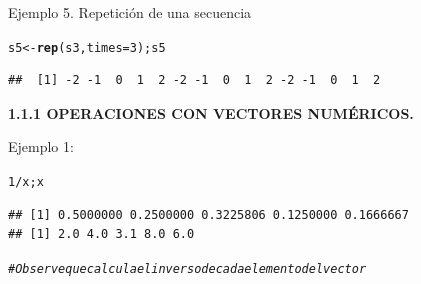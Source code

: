 \documentclass[12pt,letterpaper]{article}\usepackage[]{graphicx}\usepackage[]{color}
\makeatletter
\newcommand{\hlnum}[1]{\textcolor[rgb]{0.686,0.059,0.569}{#1}}%
\newcommand{\hlcom}[1]{\textcolor[rgb]{0.678,0.584,0.686}{\textit{#1}}}%
\newcommand{\hlopt}[1]{\textcolor[rgb]{0,0,0}{#1}}%
\newcommand{\hlstd}[1]{\textcolor[rgb]{0.345,0.345,0.345}{#1}}%
\newcommand{\hlkwb}[1]{\textcolor[rgb]{0.69,0.353,0.396}{#1}}%
\newcommand{\hlkwc}[1]{\textcolor[rgb]{0.333,0.667,0.333}{#1}}%
\newcommand{\hlkwd}[1]{\textcolor[rgb]{0.737,0.353,0.396}{\textbf{#1}}}%
\newenvironment{kframe}{%
 \def\at@end@of@kframe{}%
 \ifinner\ifhmode%
  \def\at@end@of@kframe{\end{minipage}}%
  \begin{minipage}{\columnwidth}%
 \fi\fi%
 \def\FrameCommand##1{\hskip\@totalleftmargin \hskip-\fboxsep
 \colorbox{shadecolor}{##1}\hskip-\fboxsep
     \hskip-\linewidth \hskip-\@totalleftmargin \hskip\columnwidth}%
 \MakeFramed {\advance\hsize-\width
   \@totalleftmargin\z@ \linewidth\hsize
   \@setminipage}}%
 {\par\unskip\endMakeFramed%
 \at@end@of@kframe}
\newenvironment{knitrout}{}{} %
\makeatother
\begin{document}
Ejemplo 5. Repetici\'on de una secuencia
\begin{knitrout}
\color{fgcolor}\begin{kframe}
\begin{alltt}
\hlstd{s5} \hlkwb{<-} \hlkwd{rep}\hlstd{(s3,} \hlkwc{times}\hlstd{=}\hlnum{3}\hlstd{); s5}
\end{alltt}
\begin{verbatim}
##  [1] -2 -1  0  1  2 -2 -1  0  1  2 -2 -1  0  1  2
\end{verbatim}
\end{kframe}
\end{knitrout}
\begin{center}
\textbf{1.1.1 OPERACIONES CON VECTORES NUM\'ERICOS.}\\
\end{center}

Ejemplo 1:
\begin{knitrout}
\color{fgcolor}\begin{kframe}
\begin{alltt}
\hlnum{1}\hlopt{/}\hlstd{x;x}
\end{alltt}
\begin{verbatim}
## [1] 0.5000000 0.2500000 0.3225806 0.1250000 0.1666667
## [1] 2.0 4.0 3.1 8.0 6.0
\end{verbatim}
\begin{alltt}
\hlcom{# Observe que calcula el inverso de cada elemento del vector}
\end{alltt}
\end{kframe}
\end{knitrout}
\end{document}
